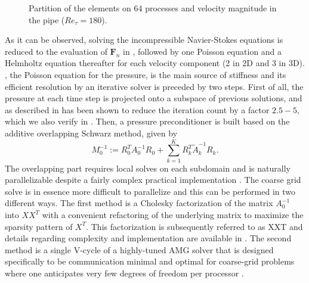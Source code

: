 \documentclass{sig-alternate}
\begin{document}
\begin{figure}
  \centering
  \caption{Partition of the elements on $64$ processes and velocity magnitude in the pipe ($Re_{\tau}=180$).}
  \label{fig:partition}
\end{figure}

As it can be observed, solving the incompressible Navier-Stokes equations is reduced 
to the evaluation of $\mathbf{F}_n$ in , followed by one Poisson 
equation and a Helmholtz equation thereafter for each velocity component (2 in 2D and 3 in 3D). 
, the Poisson equation for the pressure, is the main 
source of stiffness and its efficient resolution by an iterative solver is preceded 
by two steps. First of all, the pressure at each time step is projected onto a 
subspace of previous solutions, and as described in \cite{Fischer1998} has been shown 
to reduce the iteration count by a factor $2.5-5$, which we also verify in .
Then, a pressure preconditioner is built based on the additive overlapping Schwarz 
method, given by 
\begin{equation}
 M_0^{-1} := R_0^T A_{0}^{-1} R_0 + \sum_{k=1}^{K} R_k^T \tilde{A}_k^{-1} R_k.
\end{equation}
The overlapping part requires local solves on each subdomain and is naturally parallelizable 
despite a fairly complex practical implementation \cite{Fischer199784,Fischer2005}. 
The coarse grid solve is in essence more difficult to parallelize and this can be 
performed in two different ways. The first 
method is a Cholesky factorization of the matrix $A_0^{-1}$ into $XX^T$ with a 
convenient refactoring of the underlying matrix to maximize the sparsity pattern 
of $X^T$. This factorization is subsequently referred to as XXT and details 
regarding complexity and implementation are available in \cite{Tufo2001151}. The 
second method is a single V-cycle of a highly-tuned
AMG solver that is designed specifically to be communication minimal
and optimal for coarse-grid problems where one anticipates very
few degrees of freedom per processor \cite{LottesAMG}. %
\end{document}
